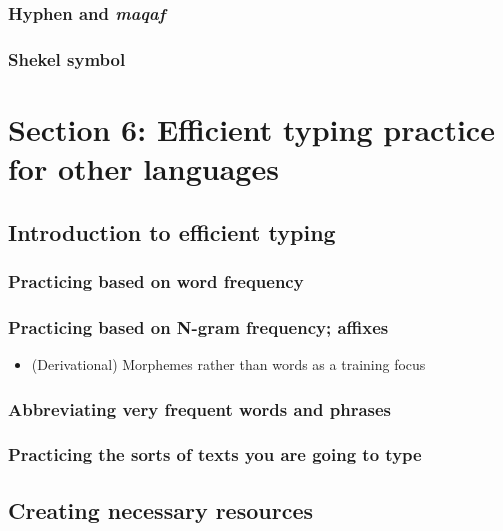 \documentclass[11pt]{article}
\begin{document}
\subsubsection{Hyphen and \emph{maqaf}}
\label{sec:orgc9105dc}

\subsubsection{Shekel symbol}
\label{sec:orgc4ccc9f}

\section{Section 6: Efficient typing practice for other languages}
\label{sec:orga1e2d3d}

\subsection{Introduction to efficient typing}
\label{sec:orgefbe503}

\subsubsection{Practicing based on word frequency}
\label{sec:orgb36c87a}

\subsubsection{Practicing based on N-gram frequency; affixes}
\label{sec:org5af9904}

\begin{itemize}
\item (Derivational) Morphemes rather than words as a training focus
\end{itemize}

\subsubsection{Abbreviating very frequent words and phrases}
\label{sec:org1859006}

\subsubsection{Practicing the sorts of texts you are going to type}
\label{sec:orgb00b3d9}

\subsection{Creating necessary resources}
\label{sec:orga8c7d8b}
\end{document}
